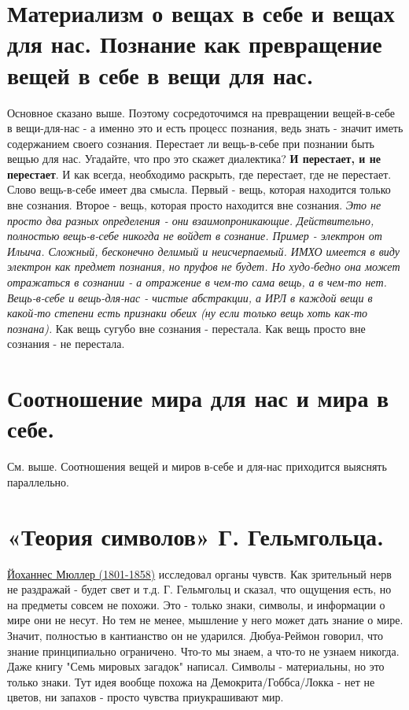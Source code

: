 \section{ Материализм о вещах в себе и вещах для нас. Познание как превращение вещей в себе в вещи для нас.}
Основное сказано выше. Поэтому сосредоточимся на превращении вещей-в-себе в вещи-для-нас - а именно это и есть процесс познания, ведь знать - значит иметь содержанием своего сознания. Перестает ли вещь-в-себе при познании быть вещью для нас. Угадайте, что про это скажет диалектика? \textbf{И перестает, и не перестает}. И как всегда, необходимо раскрыть, где перестает, где не перестает. Слово вещь-в-себе имеет два смысла. Первый - вещь, которая находится только вне сознания. Второе - вещь, которая просто находится вне сознания. \textit{Это не просто два разных определения - они взаимопроникающие. Действительно, полностью вещь-в-себе никогда не войдет в сознание. Пример - электрон от Ильича. Сложный, бесконечно делимый и неисчерпаемый. ИМХО имеется в виду электрон как предмет познания, но пруфов не будет. Но худо-бедно она может отражаться в сознании - а отражение в чем-то сама вещь, а в чем-то нет. Вещь-в-себе и вещь-для-нас - чистые абстракции, а ИРЛ в каждой вещи в какой-то степени есть признаки обеих (ну если только вещь хоть как-то познана).} Как вещь сугубо вне сознания - перестала. Как вещь просто вне сознания - не перестала.

\section{ Соотношение мира для нас и мира в себе.}
См. выше. Соотношения вещей и миров в-себе и для-нас приходится выяснять параллельно.

\section{ «Теория символов» Г. Гельмгольца.}
\underline{Йоханнес Мюллер (1801-1858)} исследовал органы чувств. Как зрительный нерв не раздражай - будет свет и т.д. 
Г. Гельмгольц и сказал, что ощущения есть, но на предметы совсем не похожи. Это - только знаки, символы, и информации о мире они не несут. Но тем не менее, мышление у него может дать знание о мире. Значит, полностью в кантианство он не ударился. Дюбуа-Реймон говорил, что знание принципиально ограничено. Что-то мы знаем, а что-то не узнаем никогда. Даже книгу "Семь мировых загадок" написал. Символы - материальны, но это только знаки. Тут идея вообще похожа на Демокрита/Гоббса/Локка - нет не цветов, ни запахов - просто чувства приукрашивают мир.

